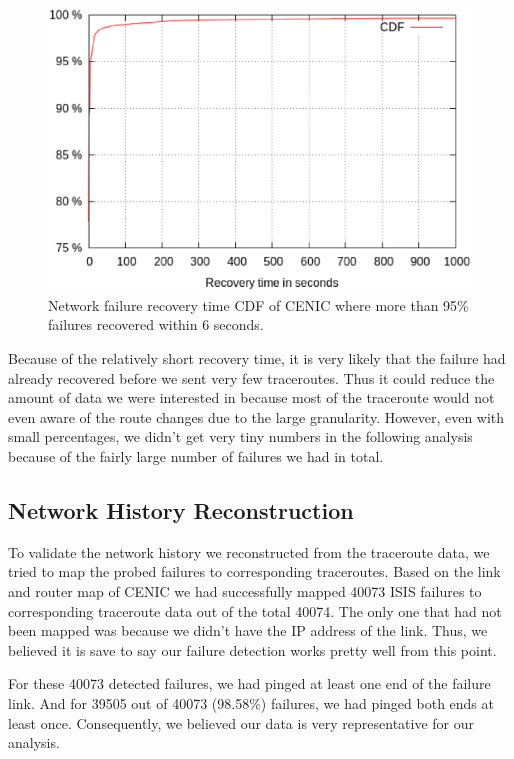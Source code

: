 \documentclass[conference, twocolumn, oneside, 10pt]{IEEEtran}
\begin{document}
\begin{figure}[h!]
\centering
\includegraphics[scale=0.4]{plot/failure_time.eps}
\caption{Network failure recovery time CDF of CENIC where more than 95\% failures recovered within 6 seconds.}
\label{fig:failuretime}
\end{figure}

Because of the relatively short recovery time, it is very likely that the failure had already recovered before we sent very few traceroutes. Thus it could reduce the amount of data we were interested in because most of the traceroute would not even aware of the route changes due to the large granularity. However, even with small percentages, we didn't get very tiny numbers in the following analysis because of the fairly large number of failures we had in total.

\subsection{Network History Reconstruction}

To validate the network history we reconstructed from the traceroute data, we tried to map the probed failures to corresponding traceroutes. Based on the link and router map of CENIC we had successfully mapped 40073 ISIS failures to corresponding traceroute data out of the total 40074. The only one that had not been mapped was because we didn't have the IP address of the link. Thus, we believed it is save to say our failure detection works pretty well from this point.

For these 40073 detected failures, we had pinged at least one end of the failure link. And for 39505 out of 40073 (98.58\%) failures, we had pinged both ends at least once. Consequently, we believed our data is very representative for our analysis.
\end{document}
